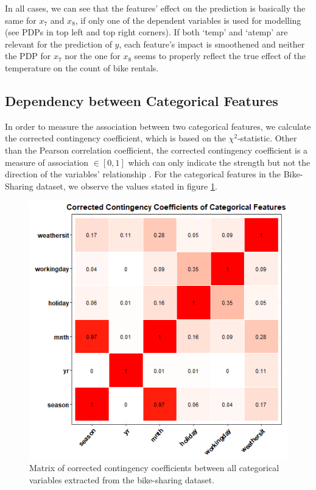 \documentclass[]{krantz}
\begin{document}
In all cases, we can see that the features' effect on the prediction is
basically the same for \(x_7\) and \(x_8\), if only one of the dependent
variables is used for modelling (see PDPs in top left and top right
corners). If both `temp' and `atemp' are relevant for the prediction of
\(y\), each feature's impact is smoothened and neither the PDP for
\(x_7\) nor the one for \(x_8\) seems to properly reflect the true
effect of the temperature on the count of bike rentals.

\subsection{Dependency between Categorical
Features}\label{dependency-between-categorical-features}

In order to measure the association between two categorical features, we
calculate the corrected contingency coefficient, which is based on the
\(\chi^2\)-statistic. Other than the Pearson correlation coefficient,
the corrected contingency coefficient is a measure of association
\(\in [0,1]\) which can only indicate the strength but not the direction
of the variables' relationship \citep{fahrmeir2016statistik}. For the
categorical features in the Bike-Sharing dataset, we observe the values
stated in figure \ref{fig:Figure07}.

\begin{figure}

{\centering \includegraphics[width=0.8\linewidth]{images/VK_PDP_7_Cat_Correlation_Matrix} 

}

\caption{Matrix of corrected contingency coefficients between all categorical variables extracted from the bike-sharing dataset.}\label{fig:Figure07}
\end{figure}
\end{document}

